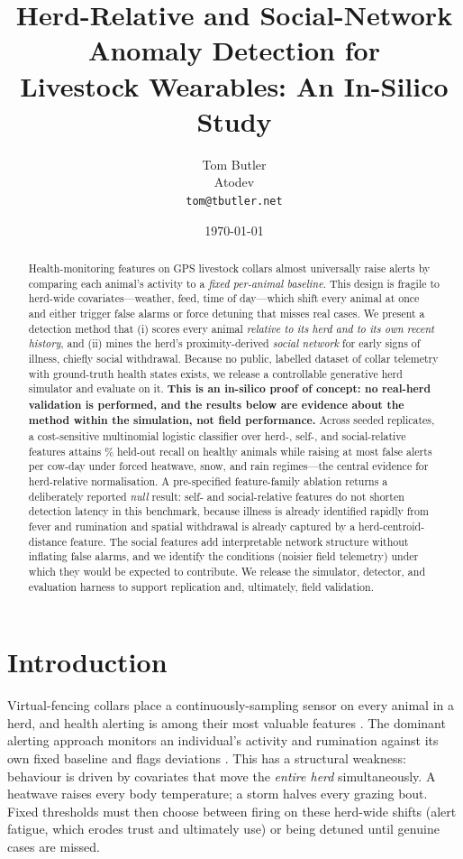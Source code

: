 \documentclass[11pt]{article}
\title{\vspace{-1em}Herd-Relative and Social-Network Anomaly Detection for\\
Livestock Wearables: An In-Silico Study}
\author{Tom Butler\\\small Atodev \\ \small\texttt{tom@tbutler.net}}
\date{\today}
\begin{document}
\maketitle

\begin{abstract}
\noindent
Health-monitoring features on GPS livestock collars almost universally raise
alerts by comparing each animal's activity to a \emph{fixed per-animal
baseline}. This design is fragile to herd-wide covariates---weather, feed, time
of day---which shift every animal at once and either trigger false alarms or
force detuning that misses real cases. We present a detection method that (i)
scores every animal \emph{relative to its herd and to its own recent history},
and (ii) mines the herd's proximity-derived \emph{social network} for early
signs of illness, chiefly social withdrawal. Because no public, labelled dataset
of collar telemetry with ground-truth health states exists, we release a
controllable generative herd simulator and evaluate on it. \textbf{This is an
in-silico proof of concept: no real-herd validation is performed, and the
results below are evidence about the method within the simulation, not field
performance.} Across \numreplicates{} seeded replicates, a cost-sensitive
multinomial logistic classifier over \numfeatures{} herd-, self-, and
social-relative features attains \healthyrecall\%{} held-out recall on healthy
animals while raising at most \socialworstfp{} false alerts per cow-day under
forced heatwave, snow, and rain regimes---the central evidence for herd-relative
normalisation. A pre-specified feature-family ablation returns a deliberately
reported \emph{null} result: self- and social-relative features do not shorten
detection latency in this benchmark, because illness is already identified
rapidly from fever and rumination and spatial withdrawal is already captured by a
herd-centroid-distance feature. The social features add interpretable network
structure without inflating false alarms, and we identify the conditions
(noisier field telemetry) under which they would be expected to contribute. We
release the simulator, detector, and evaluation harness to support replication
and, ultimately, field validation.
\end{abstract}

\section{Introduction}
Virtual-fencing collars place a continuously-sampling sensor on every animal in
a herd, and health alerting is among their most valuable features
\citep{berckmans2017plf,rutten2013economic}. The dominant alerting approach
monitors an individual's activity and rumination against its own fixed baseline
and flags deviations \citep{stangaferro2016ketosis}. This has a structural
weakness: behaviour is driven by covariates that move the \emph{entire herd}
simultaneously. A heatwave raises every body temperature; a storm halves every
grazing bout. Fixed thresholds must then choose between firing on these
herd-wide shifts (alert fatigue, which erodes trust and ultimately use) or being
detuned until genuine cases are missed.
\end{document}
